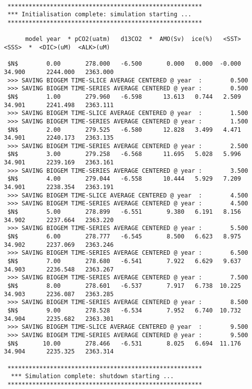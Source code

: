 \footnotesize
\begin{verbatim}

 *******************************************************
 *** Initialisation complete: simulation starting ...
 *******************************************************

      model year  * pCO2(uatm)   d13CO2  *  AMO(Sv)  ice(%)   <SST>   <SSS>  *  <DIC>(uM)  <ALK>(uM)

 $N$        0.00       278.000   -6.500       0.000   0.000  -0.000  34.900      2244.000   2363.000
 >>> SAVING BIOGEM TIME-SLICE AVERAGE CENTERED @ year  :        0.500
 >>> SAVING BIOGEM TIME-SERIES AVERAGE CENTERED @ year :        0.500
 $N$        1.00       279.960   -6.598      13.613   0.744   2.509  34.901      2241.498   2363.111
 >>> SAVING BIOGEM TIME-SLICE AVERAGE CENTERED @ year  :        1.500
 >>> SAVING BIOGEM TIME-SERIES AVERAGE CENTERED @ year :        1.500
 $N$        2.00       279.525   -6.580      12.828   3.499   4.471  34.901      2240.173   2363.135
 >>> SAVING BIOGEM TIME-SERIES AVERAGE CENTERED @ year :        2.500
 $N$        3.00       279.258   -6.568      11.695   5.028   5.996  34.901      2239.169   2363.161
 >>> SAVING BIOGEM TIME-SERIES AVERAGE CENTERED @ year :        3.500
 $N$        4.00       279.044   -6.558      10.444   5.929   7.209  34.901      2238.354   2363.191
 >>> SAVING BIOGEM TIME-SLICE AVERAGE CENTERED @ year  :        4.500
 >>> SAVING BIOGEM TIME-SERIES AVERAGE CENTERED @ year :        4.500
 $N$        5.00       278.899   -6.551       9.380   6.191   8.156  34.902      2237.664   2363.220
 >>> SAVING BIOGEM TIME-SERIES AVERAGE CENTERED @ year :        5.500
 $N$        6.00       278.777   -6.545       8.500   6.623   8.975  34.902      2237.069   2363.246
 >>> SAVING BIOGEM TIME-SERIES AVERAGE CENTERED @ year :        6.500
 $N$        7.00       278.680   -6.541       7.922   6.629   9.637  34.903      2236.548   2363.267
 >>> SAVING BIOGEM TIME-SERIES AVERAGE CENTERED @ year :        7.500
 $N$        8.00       278.601   -6.537       7.917   6.738  10.225  34.903      2236.087   2363.285
 >>> SAVING BIOGEM TIME-SERIES AVERAGE CENTERED @ year :        8.500
 $N$        9.00       278.528   -6.534       7.952   6.740  10.732  34.904      2235.682   2363.301
 >>> SAVING BIOGEM TIME-SLICE AVERAGE CENTERED @ year  :        9.500
 >>> SAVING BIOGEM TIME-SERIES AVERAGE CENTERED @ year :        9.500
 $N$       10.00       278.466   -6.531       8.025   6.694  11.176  34.904      2235.325   2363.314

 *******************************************************
  *** Simulation complete: shutdown starting ...
 *******************************************************

\end{verbatim}
\normalsize

